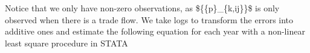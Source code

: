 \documentclass[12pt,twoside,a4paper,notitlepage]{article}
\begin{document}
Notice that we only have non-zero observations, as \$\{\{p\}\_\{k,ij\}\}\$ is only observed when there is a trade flow. We take logs to transform the errors into additive ones and estimate the following equation for each year with a non-linear least square procedure in STATA%
\end{document}
